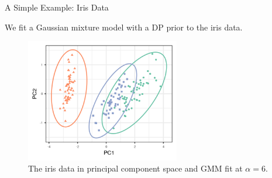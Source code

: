 \begin{frame}{A Simple Example: Iris Data}

We fit a Gaussian mixture model with a DP prior to
the iris data.

\begin{figure}[!h]
  \centering
  \includegraphics[width = 0.6\textwidth]{./figure/iris_init-1.png}
  \caption*{The iris data in principal component space and GMM fit at $\alpha = 6$.}
\end{figure}

\end{frame}

